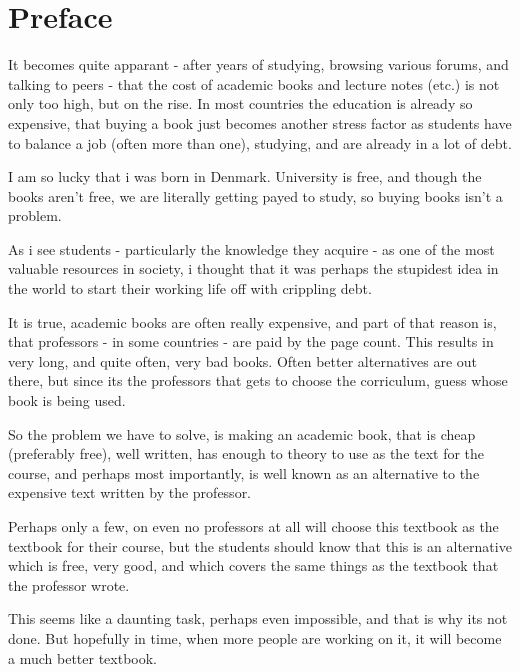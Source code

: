 \documentclass[textbook.tex]{subfiles}
\begin{document}
\chapter{Preface}

It becomes quite apparant - after years of studying, browsing various forums, and talking to peers - that the cost of academic books and lecture notes (etc.) is not only too high, but on the rise. In most countries the education is already so expensive, that buying a book just becomes another stress factor as students have to balance a job (often more than one), studying, and are already in a lot of debt.

I am so lucky that i was born in Denmark. University is free, and though the books aren't free, we are literally getting payed to study, so buying books isn't a problem.

As i see students - particularly the knowledge they acquire - as one of the most valuable resources in society, i thought that it was perhaps the stupidest idea in the world to start their working life off with crippling debt.

It is true, academic books are often really expensive, and part of that reason is, that professors - in some countries - are paid by the page count. This results in very long, and quite often, very bad books. Often better alternatives are out there, but since its the professors that gets to choose the corriculum, guess whose book is being used.

So the problem we have to solve, is making an academic book, that is cheap (preferably free), well written, has enough to theory to use as the text for the course, and perhaps most importantly, is well known as an alternative to the expensive text written by the professor.

Perhaps only a few, on even no professors at all will choose this textbook as the textbook for their course, but the students should know that this is an alternative which is free, very good, and which covers the same things as the textbook that the professor wrote.

This seems like a daunting task, perhaps even impossible, and that is why its not done. But hopefully in time, when more people are working on it, it will become a much better textbook.
\end{document}
